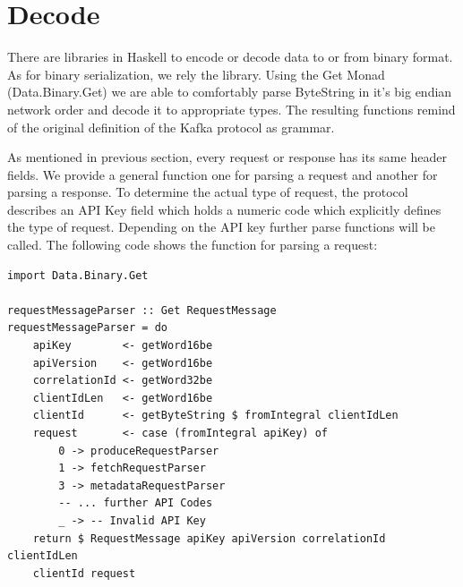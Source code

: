 




\section{Decode}
There are libraries in Haskell to encode or decode data to or from binary format. 
As for binary serialization, we rely the
library. Using the Get Monad (Data.Binary.Get) we are able to comfortably parse
ByteString in it's big endian network order and decode it to appropriate types.
The resulting functions remind of the original definition of the Kafka protocol
as grammar. 

As mentioned in previous section, every request or response has its same header
fields. We provide a general function one for parsing a request and another for
parsing a response. To determine the actual type of request, the protocol describes
an API Key field which holds a numeric code which explicitly defines the type of
request. Depending on the API key further parse functions will be called. The
following code shows the function for parsing a request: 
\begin{lstlisting}
import Data.Binary.Get

requestMessageParser :: Get RequestMessage 
requestMessageParser = do 
    apiKey        <- getWord16be
    apiVersion    <- getWord16be
    correlationId <- getWord32be
    clientIdLen   <- getWord16be
    clientId      <- getByteString $ fromIntegral clientIdLen
    request       <- case (fromIntegral apiKey) of
        0 -> produceRequestParser
        1 -> fetchRequestParser
        3 -> metadataRequestParser
        -- ... further API Codes 
        _ -> -- Invalid API Key 
    return $ RequestMessage apiKey apiVersion correlationId clientIdLen
    clientId request
\end{lstlisting}

